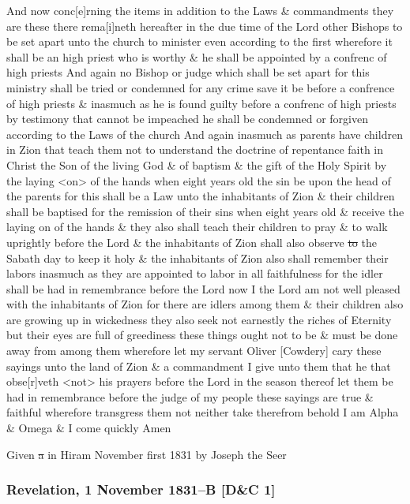 {				And now conc[e]rning the items in addition to the Laws \& commandments they are these there rema[i]neth hereafter in the due time of the Lord other Bishops to be set apart unto the church to minister even according to the first wherefore it shall be an high priest who is worthy \& he shall be appointed by a confrenc of high priests And again no Bishop or judge which shall be set apart for this ministry shall be tried or condemned for any crime save it be before a confrence of high priests \& inasmuch as he is found guilty before a confrenc of high priests by testimony that cannot be impeached he shall be condemned or forgiven according to the Laws of the church And again inasmuch as parents have children in Zion that teach them not to understand the doctrine of repentance faith in Christ the Son of the living God \& of baptism \& the gift of the Holy Spirit by the laying <on> of the hands when eight years old the sin be upon the head of the parents for this shall be a Law unto the inhabitants of Zion \& their children shall be baptised for the remission of their sins when eight years old \& receive the laying on of the hands \& they also shall teach their children to pray \& to walk uprightly before the Lord \& the inhabitants of Zion shall also observe \sout{to} the Sabath day to keep it holy \& the inhabitants of Zion also shall remember their labors inasmuch as they are appointed to labor in all faithfulness for the idler shall be had in remembrance before the Lord now I the Lord am not well pleased with the inhabitants of Zion for there are idlers among them \& their children also are growing up in wickedness they also seek not earnestly the riches of Eternity but their eyes are full of greediness these things ought not to be \& must be done away from among them wherefore let my servant Oliver [Cowdery] cary these sayings unto the land of Zion \& a commandment I give unto them that he that obse[r]veth <not> his prayers before the Lord in the season thereof let them be had in remembrance before the judge of my people these sayings are true \& faithful wherefore transgress them not neither take therefrom behold I am Alpha \& Omega \& I come quickly Amen
				
				Given \sout{a} in Hiram November first 1831 by Joseph the Seer 
				
		\subsubsection{Revelation, 1 November 1831--B [D\&C 1]}
			\label{EMS-1831-JS-1-NOV-1831-B}
		
}
